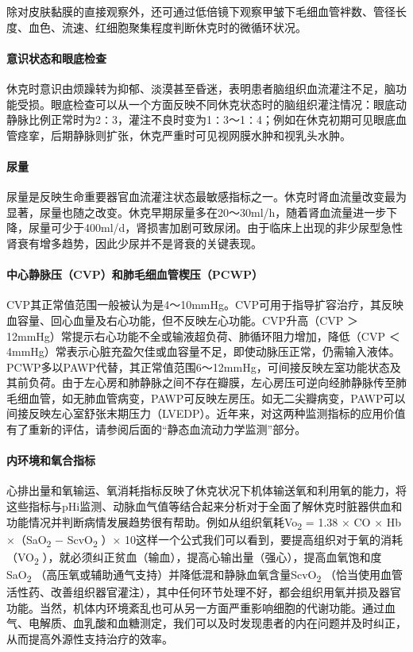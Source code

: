 除对皮肤黏膜的直接观察外，还可通过低倍镜下观察甲皱下毛细血管袢数、管径长度、血色、流速、红细胞聚集程度判断休克时的微循环状况。

\paragraph{意识状态和眼底检查}

休克时意识由烦躁转为抑郁、淡漠甚至昏迷，表明患者脑组织血流灌注不足，脑功能受损。眼底检查可以从一个方面反映不同休克状态时的脑组织灌注情况：眼底动静脉比例正常时为2∶3，灌注不良时变为1∶3～1∶4；例如在休克初期可见眼底血管痉挛，后期静脉则扩张，休克严重时可见视网膜水肿和视乳头水肿。

\paragraph{尿量}

尿量是反映生命重要器官血流灌注状态最敏感指标之一。休克时肾血流量改变最为显著，尿量也随之改变。休克早期尿量多在20～30ml/h，随着肾血流量进一步下降，尿量可少于400ml/d，肾损害加剧可致尿闭。由于临床上出现的非少尿型急性肾衰有增多趋势，因此少尿并不是肾衰的关键表现。

\paragraph{中心静脉压（CVP）和肺毛细血管楔压（PCWP）}

CVP其正常值范围一般被认为是4～10mmHg。CVP可用于指导扩容治疗，其反映血容量、回心血量及右心功能，但不反映左心功能。CVP升高（CVP
＞ 12mmHg）常提示右心功能不全或输液超负荷、肺循环阻力增加，降低（CVP ＜
4mmHg）常表示心脏充盈欠佳或血容量不足，即使动脉压正常，仍需输入液体。PCWP多以PAWP代替，其正常值范围6～12mmHg，可间接反映左室功能状态及其前负荷。由于左心房和肺静脉之间不存在瓣膜，左心房压可逆向经肺静脉传至肺毛细血管，如无肺血管病变，PAWP可反映左房压。如无二尖瓣病变，PAWP可以间接反映左心室舒张末期压力（LVEDP）。近年来，对这两种监测指标的应用价值有了重新的评估，请参阅后面的“静态血流动力学监测”部分。

\paragraph{内环境和氧合指标}

心排出量和氧输运、氧消耗指标反映了休克状况下机体输送氧和利用氧的能力，将这些指标与pHi监测、动脉血气值等结合起来分析对于全面了解休克时脏器供血和功能情况并判断病情发展趋势很有帮助。例如从组织氧耗Vo\textsubscript{2}
= 1.38 × CO × Hb ×（SaO\textsubscript{2} − ScvO\textsubscript{2} ）×
10这样一个公式我们可以看到，要提高组织对于氧的消耗（VO\textsubscript{2}
），就必须纠正贫血（输血），提高心输出量（强心），提高血氧饱和度SaO\textsubscript{2}
（高压氧或辅助通气支持）并降低混和静脉血氧含量ScvO\textsubscript{2}
（恰当使用血管活性药、改善组织器官灌注），其中任何环节处理不好，都会组织用氧并损及器官功能。当然，机体内环境紊乱也可从另一方面严重影响细胞的代谢功能。通过血气、电解质、血乳酸和血糖测定，我们可以及时发现患者的内在问题并及时纠正，从而提高外源性支持治疗的效率。

